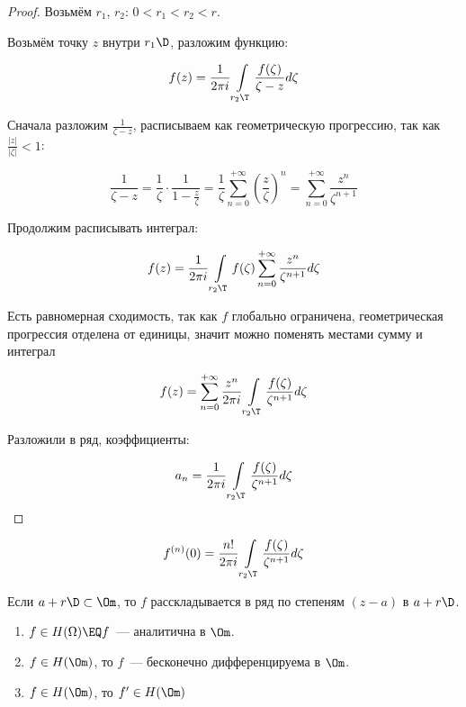 \begin{proof}
    Возьмём $r_1$, $r_2$: $0 < r_1 < r_2 < r$.

    Возьмём точку $z$ внутри $r_1\D$, разложим функцию:

    \[
        f(z) = \frac{1}{2\pi i} \int\limits_{r_2\T}
        \frac{f(\zeta)}{\zeta - z} d\zeta
    \]

    Сначала разложим $\frac{1}{\zeta - z}$,
    расписываем как геометрическую прогрессию,
    так как $\frac{|z|}{|\zeta|} < 1$:

    \[
        \frac{1}{\zeta - z} =
        \frac{1}{\zeta} \cdot \frac{1}{1 - \frac{z}{\zeta}}
        = \frac{1}{\zeta}
        \sum\limits_{n=0}^{+\infty} \left(\frac{z}{\zeta}\right)^n
        = \sum\limits_{n=0}^{+\infty} \frac{z^n}{\zeta^{n+1}}
    \]

    Продолжим расписывать интеграл:

    \[
        f(z) = \frac{1}{2\pi i} \int\limits_{r_2\T}
        f(\zeta) \sum\limits_{n=0}^{+\infty} \frac{z^n}{\zeta^{n+1}} d\zeta
    \]

    Есть равномерная сходимость, так как $f$ глобально
    ограничена, геометрическая прогрессия отделена от
    единицы, значит можно поменять местами
    сумму и интеграл

    \[
        f(z) =
        \sum\limits_{n=0}^{+\infty} \frac{z^n}{2\pi i} \int\limits_{r_2\T}
        \frac{f(\zeta) }{\zeta^{n+1}}d\zeta
    \]

    Разложили в ряд, коэффициенты:

    \[
        a_n = \frac{1}{2\pi i}
        \int\limits_{r_2\T} \frac{f(\zeta)}{\zeta^{n+1}}d\zeta
    \]
\end{proof}

\begin{consequence}
    \[ f^{(n)}(0) = \frac{n!}{2\pi i}
        \int\limits_{r_2\T} \frac{f(\zeta)}{\zeta^{n+1}}d\zeta
    \]
\end{consequence}

\begin{observation}
    Если $a + r\D \subset \Om$, то
    $f$ расскладывается в ряд по степеням $(z-a)$
    в $a + r\D$.
\end{observation}

\begin{consequences}
    \begin{enumerate}
        \item $f \in H(\Omega) \EQ f$~--- аналитична в
              $\Om$.
        \item $f\in H(\Om)$, то $f$~--- бесконечно дифференцируема в
              $\Om$.
        \item $f\in H(\Om)$, то $f' \in H(\Om)$
    \end{enumerate}
\end{consequences}

